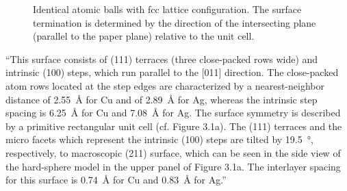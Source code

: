 \begin{figure}\centering
	\caption{Identical atomic balls with fcc lattice configuration. The surface termination is determined by the direction of the intersecting plane (parallel to the paper plane) relative to the unit cell.}
	\label{fig:crystal-termination}
\end{figure}

 
 ``This surface consists of (111) terraces (three close-packed rows wide) and intrinsic (100) steps, which run parallel to the [011] direction. The close-packed atom rows located at the step edges are characterized by
a nearest-neighbor distance of \SI{2.55}{\angstrom}  for Cu and of \SI{2.89}{\angstrom} for Ag, whereas the intrinsic step
spacing is \SI{6.25}{\angstrom} for Cu and \SI{7.08}{\angstrom} for Ag. The surface symmetry is described by a primitive
rectangular unit cell (cf. Figure 3.1a). The (111) terraces and the micro facets which represent the intrinsic (100) steps are tilted by \SI{19.5}{\degree}, respectively, to macroscopic (211) surface, which can be seen in the side view of the hard-sphere model in the upper panel of Figure 3.1a. The interlayer spacing for this surface is \SI{0.74}{\angstrom} for Cu and \SI{0.83}{\angstrom} for Ag.''

